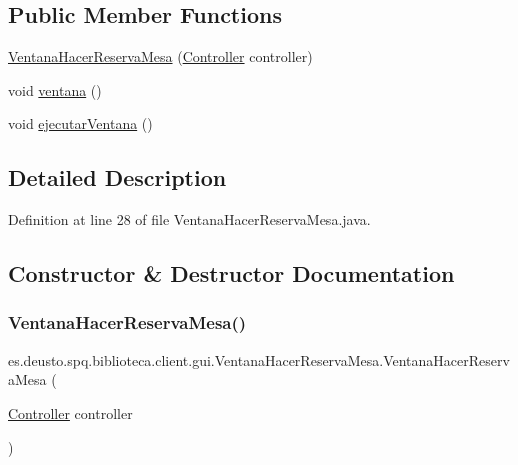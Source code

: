 \subsection*{Public Member Functions}
\begin{DoxyCompactItemize}
\item 
\mbox{\hyperlink{classes_1_1deusto_1_1spq_1_1biblioteca_1_1client_1_1gui_1_1_ventana_hacer_reserva_mesa_a74ccf83761251354774c463d838c2ff4}{Ventana\+Hacer\+Reserva\+Mesa}} (\mbox{\hyperlink{classes_1_1deusto_1_1spq_1_1biblioteca_1_1controller_1_1_controller}{Controller}} controller)
\item 
void \mbox{\hyperlink{classes_1_1deusto_1_1spq_1_1biblioteca_1_1client_1_1gui_1_1_ventana_hacer_reserva_mesa_a02e760f41c682169da251b802cf65181}{ventana}} ()
\item 
void \mbox{\hyperlink{classes_1_1deusto_1_1spq_1_1biblioteca_1_1client_1_1gui_1_1_ventana_hacer_reserva_mesa_add76e330dbe570de87529a4a8323e2f2}{ejecutar\+Ventana}} ()
\end{DoxyCompactItemize}


\subsection{Detailed Description}


Definition at line 28 of file Ventana\+Hacer\+Reserva\+Mesa.\+java.



\subsection{Constructor \& Destructor Documentation}
\mbox{\label{classes_1_1deusto_1_1spq_1_1biblioteca_1_1client_1_1gui_1_1_ventana_hacer_reserva_mesa_a74ccf83761251354774c463d838c2ff4}} 
\subsubsection{\texorpdfstring{Ventana\+Hacer\+Reserva\+Mesa()}{VentanaHacerReservaMesa()}}
{\footnotesize\ttfamily es.\+deusto.\+spq.\+biblioteca.\+client.\+gui.\+Ventana\+Hacer\+Reserva\+Mesa.\+Ventana\+Hacer\+Reserva\+Mesa (\begin{DoxyParamCaption}\item[{\mbox{\hyperlink{classes_1_1deusto_1_1spq_1_1biblioteca_1_1controller_1_1_controller}{Controller}}}]{controller }\end{DoxyParamCaption})}

